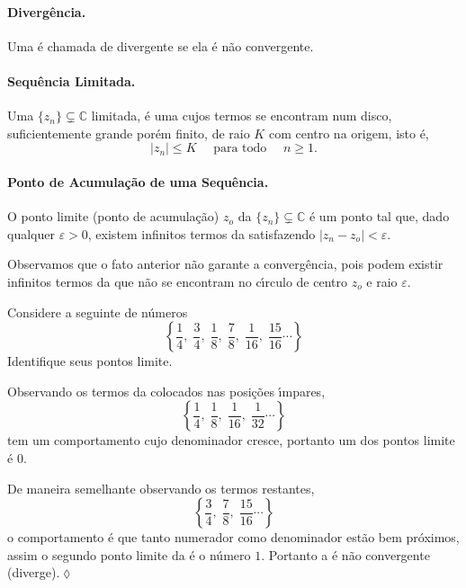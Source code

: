 \paragraph{Diverg\^{e}ncia.} Uma \seq \'{e} chamada de divergente se ela \'{e} n\~{a}o convergente.

\paragraph{Sequ\^{e}ncia Limitada.} Uma \seq $\{z_n\}\subsetneq \mathbb{C}$ limitada, \'{e} uma \seq cujos termos
se encontram num disco, suficientemente grande por\'{e}m finito, de raio $K$ com centro na origem, isto \'{e},
\begin{equation*}
|z_n| \leq K\quad  \text{ para todo } \quad n\ge 1.
\end{equation*}

\paragraph{Ponto de Acumula\c{c}\~{a}o de uma Sequ\^{e}ncia.} O ponto limite (ponto de acumula\c{c}\~{a}o) $z_o$ da \seq $\{z_n\}\subsetneq \mathbb{C}$ \'{e} um ponto
tal que, dado qualquer $\varepsilon>0$, existem infinitos termos da \seq satisfazendo $|z_n-z_o|<\varepsilon$.

Observamos que o fato anterior n\~{a}o garante a converg\^{e}ncia, pois podem existir infinitos termos da \seq que n\~{a}o se encontram no
c\'{\i}rculo de centro $z_o$ e raio $\varepsilon$.

\begin{exer}
Considere a seguinte \seq de n\'{u}meros
\begin{equation*}
  \left\{\frac{1}{4},\; \frac{3}{4}, \; \frac{1}{8}, \; \frac{7}{8}, \;\frac{1}{16}, \; \frac{15}{16}\cdots \right\}
\end{equation*}
Identifique seus pontos limite.
\end{exer}

\solo Observando os termos da \seq colocados nas posi\c{c}\~{o}es \'{\i}mpares,
\begin{equation*}
\left\{\frac{1}{4}, \; \frac{1}{8}, \;\frac{1}{16}, \; \frac{1}{32}\cdots \right\}
\end{equation*}
tem um comportamento cujo denominador cresce, portanto um dos pontos limite \'{e} $0$.

De maneira semelhante observando os termos restantes,
\begin{equation*}
  \left\{\frac{3}{4}, \; \frac{7}{8}, \; \frac{15}{16}\cdots \right\}
\end{equation*}
o comportamento \'{e} que tanto numerador como denominador est\~{a}o bem pr\'{o}ximos,  assim o segundo ponto limite da \seq \'{e} o n\'{u}mero $1$.
Portanto a \seq \'{e} n\~{a}o convergente (diverge).\hfill \(\lozenge\)

